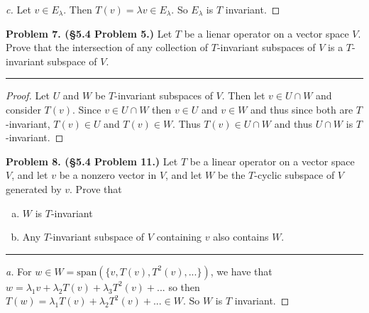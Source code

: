 \documentclass[leqno]{article}
\theoremstyle{nonumberplain}
\newtheorem{proof}{Proof}
\begin{document}
\begin{proof}[c]
Let $v\in E_\lambda$. Then $T(v)=\lambda v \in E_\lambda$. So $E_\lambda$ is $T$ invariant.
\end{proof}

\pagebreak




\noindent\textbf{Problem 7. (\S 5.4 Problem 5.)} Let $T$ be a lienar operator on a vector space $V$. Prove that the intersection of any collection of $T$-invariant subspaces of $V$ is a $T$-invariant subspace of $V$.

\noindent\rule[0.5ex]{\linewidth}{1pt}

\begin{proof}
Let $U$ and $W$ be $T$-invariant subspaces of $V$. Then let $v\in U\cap W$ and consider $T(v)$.  Since $v\in U \cap W$ then $v\in U$ and $v\in W$ and thus since both are $T$-invariant, $T(v)\in U$ and $T(v) \in W$.  Thus $T(v)\in U\cap W$ and thus $U\cap W$ is $T$-invariant.
\end{proof}

\pagebreak




\noindent\textbf{Problem 8. (\S 5.4 Problem 11.)} Let $T$ be a linear operator on a vector space $V$, and let $v$ be a nonzero vector in $V$, and let $W$ be the $T$-cyclic subspace of $V$ generated by $v$. Prove that
\begin{enumerate}[(a)]
\item $W$ is $T$-invariant
\item Any $T$-invariant subspace of $V$ containing $v$ also contains $W$.
\end{enumerate}


\noindent\rule[0.5ex]{\linewidth}{1pt}

\begin{proof}[a]
For $w\in W = \mathrm{span}(\{v,T(v),T^2(v),...\})$, we have that $w=\lambda_1 v +\lambda_2 T(v) + \lambda_3 T^2(v) + ...$ so then $T(w)=\lambda_1 T(v) + \lambda_2 T^2(v) + ... \in W$. So $W$ is $T$ invariant.
\end{proof}
\end{document}
